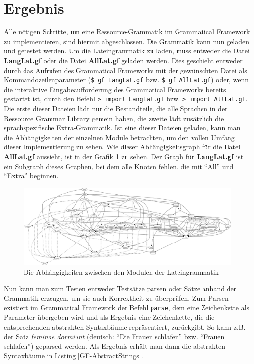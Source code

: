 \section{Ergebnis}
Alle nötigen Schritte, um eine Ressource-Grammatik im Grammatical Framework zu implementieren, sind hiermit abgeschlossen. Die Grammatik kann nun geladen und getestet werden. Um die Lateingrammatik zu laden, muss entweder die Datei \textbf{LangLat.gf} oder die Datei \textbf{AllLat.gf} geladen werden. Dies geschieht entweder durch das Aufrufen des Grammatical Frameworks mit der gewünschten Datei als Kommandozeilenparameter (\texttt{\$ gf LangLat.gf} bzw. \texttt{\$ gf AllLat.gf}) oder, wenn die interaktive Eingabeaufforderung des Grammatical Frameworks bereits gestartet ist, durch den Befehl \texttt{> import LangLat.gf} bzw. \texttt{> import AllLat.gf}. Die erste dieser Dateien lädt nur die Bestandteile, die alle Sprachen in der Ressource Grammar Library gemein haben, die zweite lädt zusätzlich die sprachspezifische Extra-Grammatik. Ist eine dieser Dateien geladen, kann man die Abhängigkeiten der einzelnen Module betrachten, um den vollen Umfang dieser Implementierung zu sehen. Wie dieser Abhängigkeitsgraph für die Datei \textbf{AllLat.gf} aussieht, ist in der Grafik \ref{GF-DepGraph} zu sehen. Der Graph für \textbf{LangLat.gf} ist ein Subgraph dieses Graphen, bei dem alle Knoten fehlen, die mit ``All'' und ``Extra'' beginnen. \par
\begin{figure}
\includegraphics[scale=0.25]{graphics/LatinDependencyGraph.eps}
\caption{Die Abhängigkeiten zwischen den Modulen der Lateingrammatik}\label{GF-DepGraph}
\end{figure}
Nun kann man zum Testen entweder Testsätze parsen oder Sätze anhand der Grammatik erzeugen, um sie auch Korrektheit zu überprüfen. Zum Parsen existiert im Grammatical Framework der Befehl \texttt{parse}, dem eine Zeichenkette als Parameter übergeben wird und als Ergebnis eine Zeichenkette, die die entsprechenden abstrakten Syntaxbäume repräsentiert, zurückgibt. So kann z.B. der Satz \textit{feminae dormiunt} (deutsch: ``Die Frauen schlafen'' bzw. ``Frauen schlafen'') geparsed werden. Als Ergebnis erhält man dann die abstrakten Syntaxbäume in Listing \ref{GF-AbstractStrings}. 
